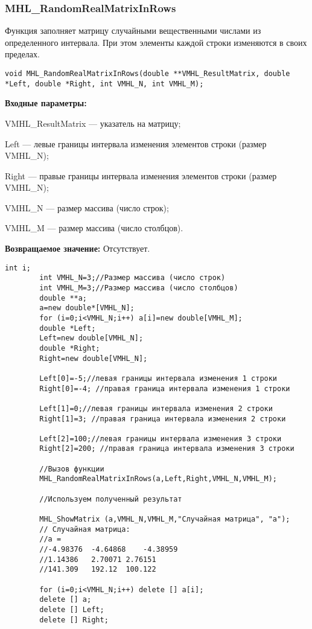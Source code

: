 \documentclass[a4paper,12pt]{article}
\begin{document}
\subsubsection{MHL\_RandomRealMatrixInRows}\label{MHL_RandomRealMatrixInRows}

Функция заполняет матрицу случайными вещественными числами из определенного интервала. При этом элементы каждой строки изменяются в своих пределах.


\begin{lstlisting}[label=code_syntax_MHL_RandomRealMatrixInRows,caption=Синтаксис]
void MHL_RandomRealMatrixInRows(double **VMHL_ResultMatrix, double *Left, double *Right, int VMHL_N, int VMHL_M);
\end{lstlisting}

\textbf{Входные параметры:}

 VMHL\_ResultMatrix --- указатель на матрицу;
 
 Left --- левые границы интервала изменения элементов строки (размер VMHL\_N);
 
 Right --- правые границы интервала изменения элементов строки (размер VMHL\_N);
 
 VMHL\_N --- размер массива (число строк);
 
 VMHL\_M --- размер массива (число столбцов).

\textbf{Возвращаемое значение:}
Отсутствует.


\begin{lstlisting}[label=code_use_MHL_RandomRealMatrixInRows,caption=Пример использования]
        int i;
        int VMHL_N=3;//Размер массива (число строк)
        int VMHL_M=3;//Размер массива (число столбцов)
        double **a;
        a=new double*[VMHL_N];
        for (i=0;i<VMHL_N;i++) a[i]=new double[VMHL_M];
        double *Left;
        Left=new double[VMHL_N];
        double *Right;
        Right=new double[VMHL_N];

        Left[0]=-5;//левая границы интервала изменения 1 строки
        Right[0]=-4; //правая граница интервала изменения 1 строки

        Left[1]=0;//левая границы интервала изменения 2 строки
        Right[1]=3; //правая граница интервала изменения 2 строки

        Left[2]=100;//левая границы интервала изменения 3 строки
        Right[2]=200; //правая граница интервала изменения 3 строки

        //Вызов функции
        MHL_RandomRealMatrixInRows(a,Left,Right,VMHL_N,VMHL_M);

        //Используем полученный результат

        MHL_ShowMatrix (a,VMHL_N,VMHL_M,"Случайная матрица", "a");
        // Случайная матрица:
        //a =
        //-4.98376	-4.64868	-4.38959
        //1.14386	2.70071	2.76151
        //141.309	192.12	100.122

        for (i=0;i<VMHL_N;i++) delete [] a[i];
        delete [] a;
        delete [] Left;
        delete [] Right;
\end{lstlisting}
\end{document}
